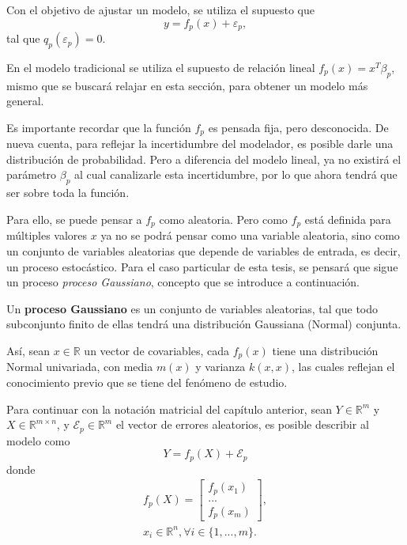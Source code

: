 Con el objetivo de ajustar un modelo, se utiliza el supuesto que
\begin{equation*}
    y = f_p(x) + \varepsilon_p,
\end{equation*}
tal que $q_p(\varepsilon_p)=0$. 

En el modelo tradicional se utiliza el supuesto de relaci\'on lineal $f_p(x) = x^T\beta_p$, mismo que se buscar\'a relajar en esta secci\'on, para obtener un modelo m\'as general.

Es importante recordar que la función $f_p$ es pensada fija, pero desconocida. De nueva cuenta, para reflejar la incertidumbre del modelador, es posible darle una distribución de probabilidad. Pero a diferencia del modelo lineal, ya no existir\'a el parámetro $\beta_p$ al cual canalizarle esta incertidumbre, por lo que ahora tendrá que ser sobre toda la función.

Para ello, se puede pensar a $f_p$ como aleatoria. Pero como $f_p$ est\'a definida para m\'ultiples valores $x$ ya no se podr\'a pensar como una variable aleatoria, sino como un conjunto de variables aleatorias que depende de variables de entrada, es decir, un proceso estoc\'astico. Para el caso particular de esta tesis, se pensar\'a que sigue un proceso \textit{proceso Gaussiano}, concepto que se introduce a continuaci\'on.

\begin{defin}
    Un \textbf{proceso Gaussiano} es un conjunto de variables aleatorias, tal que todo subconjunto finito de ellas tendr\'a una distribuci\'on Gaussiana (Normal) conjunta.
\end{defin}

As\'i, sean $x \in \mathbb{R}$ un vector de covariables, cada $f_p(x)$ tiene una distribuci\'on Normal univariada, con media $m(x)$ y varianza $k(x,x)$, las cuales reflejan el conocimiento previo que se tiene del fenómeno de estudio. 

Para continuar con la notación matricial del cap\'itulo anterior, sean $Y \in \mathbb{R}^m$ y $X \in \mathbb{R}^{m \times n}$, y $\mathcal{E}_p \in \mathbb{R}^m$ el vector de errores aleatorios, es posible describir al modelo como
\begin{equation*}
    Y = f_p(X) + \mathcal{E}_p
\end{equation*}
donde
\begin{equation*}
\begin{aligned}
    f_p(X) =     
    \left[
        \begin{array}{c}
        f_p(x_1)  \\
        ... \\
        f_p(x_m)
        \end{array}
    \right], \\
    x_i \in \mathbb{R}^n, \forall i \in \{1,...,m\}.
\end{aligned}
\end{equation*}

